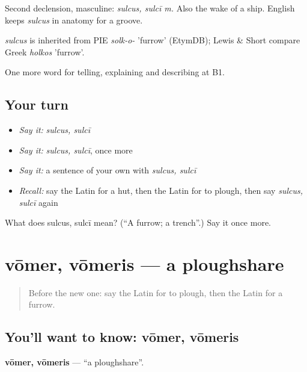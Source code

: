 Second declension, masculine: \emph{sulcus, sulcī m.} Also the wake of a ship. English keeps \emph{sulcus} in anatomy for a groove.

\begin{cousinweb}
\emph{sulcus} is inherited from PIE \emph{solk-o-} 'furrow' (EtymDB); Lewis \& Short compare Greek \emph{holkos} 'furrow'.
\end{cousinweb}

\begin{grammarlens}[title={What you've built}]
One more word for telling, explaining and describing at B1.
\end{grammarlens}

\subsection*{Your turn}
\begin{itemize}
\raggedright
  \item \emph{Say it:} \emph{sulcus, sulcī}
  \item \emph{Say it:} \emph{sulcus, sulcī}, once more
  \item \emph{Say it:} a sentence of your own with \emph{sulcus, sulcī}
  \item \emph{Recall:} say the Latin for a hut, then the Latin for to plough, then say \emph{sulcus, sulcī} again
\end{itemize}

\begin{tcolorbox}[breakable,colback=teal!4,colframe=teal!35!black,title={Before you move on}]
What does sulcus, sulcī mean? (\textquotedblleft{}A furrow; a trench\textquotedblright{}.) Say it once more.
\end{tcolorbox}
\section[vōmer, vōmeris]{vōmer, vōmeris — a ploughshare}

\label{lesson:LA-C474-vomer}



\begin{quote}
Before the new one: say the Latin for to plough, then the Latin for a furrow.
\end{quote}

\subsection*{You'll want to know: vōmer, vōmeris}
\textbf{vōmer, vōmeris} — \textquotedblleft{}a ploughshare\textquotedblright{}.

